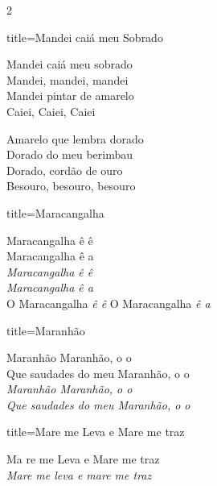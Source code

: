 \documentclass[fontsize=14pt, paper=a4, twoside, DIV=20]{scrreprt} %
\begin{document}
\begin{multicols*}{2}
\begin{song}{title={Mandei caiá meu Sobrado}}
    \begin{verse*}
            Mandei caiá meu sobrado \\
            Mandei, mandei, mandei\\
            Mandei pintar de amarelo\\
            Caiei, Caiei, Caiei\\
    \end{verse*}
     \begin{verse*}
            Amarelo que lembra dorado \\
            Dorado do meu berimbau\\
            Dorado, cordão de ouro\\
            Besouro, besouro, besouro\\
    \end{verse*}


\end{song}

\begin{song}{title={Maracangalha}}
    \begin{verse*}
        Maracangalha ê ê \\
        Maracangalha ê a \\
        \textit{Maracangalha ê ê \\
        Maracangalha ê a \\}
        O Maracangalha
        \textit{ê ê}
        O Maracangalha
        \textit{ê a}



    \end{verse*}
\end{song}
\begin{song}{title={Maranhão}}
    \begin{verse*}
        Maranhão Maranhão, o o \\
        Que saudades do meu Maranhão, o o \\
        \textit{Maranhão Maranhão, o o \\
        Que saudades do meu Maranhão, o o \\}
    \end{verse*}
\end{song}

\begin{song}{title={Mare me Leva e Mare me traz}}
        \begin{verse*}
            Ma re me Leva e Mare me traz\\
            \textit{Mare me leva e mare me traz}\\
        \end{verse*}
\end{song}


\end{multicols*}
\end{document}
